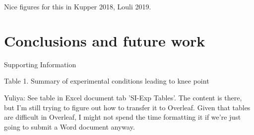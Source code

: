 \documentclass{article}
\begin{document}
Nice figures for this in Kupper 2018, Louli 2019.

\section{Conclusions and future work}




Supporting Information

Table 1. Summary of experimental conditions leading to knee point

Yuliya: See table in Excel document tab 'SI-Exp Tables'. The content is there, but I'm still trying to figure out how to transfer it to Overleaf. Given that tables are difficult in Overleaf, I might not spend the time formatting it if we're just going to submit a Word document anyway. 
\end{document}
